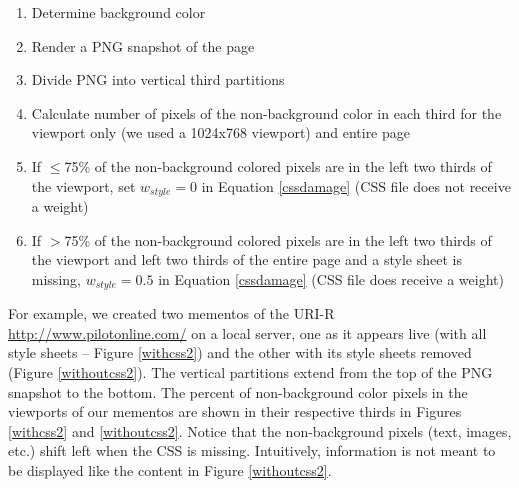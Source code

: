 \begin{enumerate}
  \item Determine background color
  \item Render a PNG snapshot of the page
  \item Divide PNG into vertical third partitions
  \item Calculate number of pixels of the non-background color in each third for the viewport only (we used a 1024x768 viewport) and entire page
  \item If $\le$75\% of the non-background colored pixels are in the left two thirds of the viewport, set \emph{$w_{style}=0$} in Equation \ref{cssdamage} (CSS file does not receive a weight)
  \item If $>$75\% of the non-background colored pixels are in the left two thirds of the viewport and left two thirds of the entire page and a style sheet is missing, \emph{$w_{style}=0.5$} in Equation \ref{cssdamage} (CSS file does receive a weight)
\end{enumerate}

For example, we created two mementos of the URI-R \url{http://www.pilotonline.com/} on a local server, one as it appears live (with all style sheets -- Figure \ref{withcss2}) and the other with its style sheets removed (Figure \ref{withoutcss2}). The vertical partitions extend from the top of the PNG snapshot to the bottom.
 The percent of non-background color pixels in the viewports of our mementos are shown in their respective thirds in Figures \ref{withcss2} and \ref{withoutcss2}. Notice that the non-background pixels (text, images, etc.) shift left when the CSS is missing. Intuitively, information is not meant to be displayed like the content in Figure \ref{withoutcss2}.

